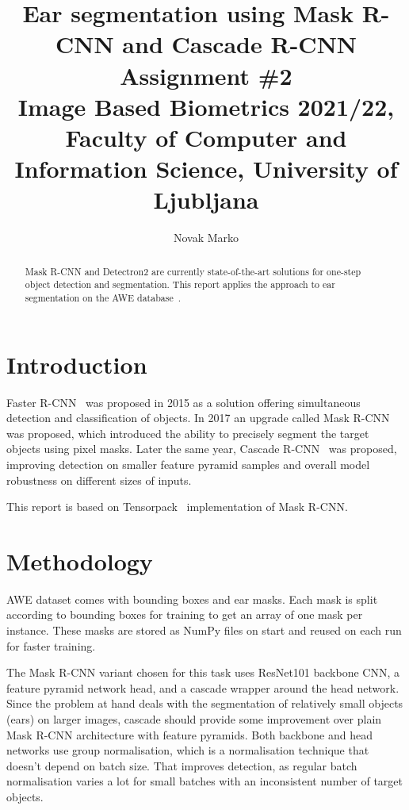 \documentclass[9pt]{IEEEtran}
\title{\vspace{0ex} %
Ear segmentation using Mask R-CNN and Cascade R-CNN
\\ \large{Assignment \#2}\\ \normalsize{Image Based Biometrics 2021/22, Faculty of Computer and Information Science, University of Ljubljana}}
\author{ %
Novak Marko
\vspace{-4.0ex}
}
\begin{document}
\maketitle

\begin{abstract}
    Mask R-CNN and Detectron2 are currently state-of-the-art solutions for one-step object detection and segmentation. This report applies the approach to ear segmentation on the AWE database~\cite{DBLP:journals/corr/EmersicSP16}. %
\end{abstract}

\section{Introduction}

Faster R-CNN~\cite{ren2016faster} was proposed in 2015 as a solution offering simultaneous detection and classification of objects. In 2017 an upgrade called Mask R-CNN~\cite{he2018mask} was proposed, which introduced the ability to precisely segment the target objects using pixel masks. Later the same year, Cascade R-CNN~\cite{cai2017cascade} was proposed, improving detection on smaller feature pyramid samples and overall model robustness on different sizes of inputs.

This report is based on Tensorpack~\cite{wu2016tensorpack} implementation of Mask R-CNN.

\section{Methodology}

AWE dataset comes with bounding boxes and ear masks. Each mask is split according to bounding boxes for training to get an array of one mask per instance. These masks are stored as NumPy files on start and reused on each run for faster training.

The Mask R-CNN variant chosen for this task uses ResNet101 backbone CNN, a feature pyramid network head, and a cascade wrapper around the head network. Since the problem at hand deals with the segmentation of relatively small objects (ears) on larger images, cascade should provide some improvement over plain Mask R-CNN architecture with feature pyramids. Both backbone and head networks use group normalisation, which is a normalisation technique that doesn't depend on batch size. That improves detection, as regular batch normalisation varies a lot for small batches with an inconsistent number of target objects.
\end{document}

